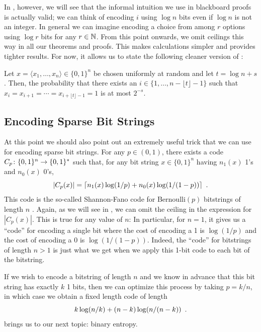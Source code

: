\documentclass{patmorin}
\newenvironment{customthm}[1]
  {\renewcommand\theinnercustomthm{#1}\innercustomthm}
  {\endinnercustomthm}
\begin{document}
In , however, we will see that the informal intuition
we use in blackboard proofs is actually valid; we can think of encoding
$i$ using $\log n$ bits even if $\log n$ is not an integer.  In general
we can imagine encoding a choice from among $r$ options using $\log r$
bits for any $r\in\mathbb{N}$.  From this point onwards, we omit ceilings this
way in all our theorems and proofs. This makes calculations simpler and
provides tighter results.  For now, it allows us to state the following cleaner version of :

\begin{customthm}{\ref{thm:runs-i}b}
  Let $x=\langle x_1,\ldots,x_n\rangle\in\{0,1\}^n$ be chosen
  uniformly at random and let $t= \log n + s$. Then, the
  probability that there exists an $i\in\{1,\ldots,n-\lfloor t\rfloor-1\}$ such that
  $x_i=x_{i+1}=\cdots=x_{i+\lfloor t\rfloor-1}=1$ is at most $2^{-s}$.
\end{customthm}

\subsection{Encoding Sparse Bit Strings}

At this point we should also point out an extremely useful trick that
we can use for encoding sparse bit strings.  For any $p\in(0,1)$, there
exists a code $C_p\colon \{0,1\}^n\rightarrow \{0,1\}^*$ such that, for
any bit string $x\in\{0,1\}^n$ having $n_1(x)$ 1's and $n_0(x)$ 0's,
\begin{equation}
    |C_p(x)| = \lceil n_1(x)\log(1/p) + n_0(x)\log(1/(1-p)) \rceil \enspace .
    \eqlabel{sparse-bitstring-i}
\end{equation}
This code is the so-called Shannon-Fano code for Bernoulli$(p)$
bitstrings of length $n$ \cite{fano:transmission,shannon:mathematical}.
Again, as we will see in , we can omit the ceiling in
the expression for $|C_p(x)|$.  This is true for any value of $n$: In
particular, for $n=1$, it gives us a ``code'' for encoding a single bit
where the cost of encoding a 1 is $\log(1/p)$ and the cost of encoding
a 0 is $\log(1/(1-p))$.  Indeed, the ``code'' for bitstrings of length
$n>1$ is just what we get when we apply this 1-bit code to each bit of
the bitstring.

If we wish to encode a bitstring of length $n$ and we know in advance that this bit string has exactly $k$ 1 bits, then we can optimize this process by taking $p=k/n$, in which case we obtain a fixed length code of length
\begin{equation}
    k\log (n/k) + (n-k)\log(n/(n-k))  \eqlabel{sparse-bitstring-ii} \enspace .
\end{equation}
 brings us to our next topic: binary entropy.
\end{document}
